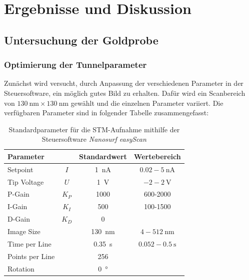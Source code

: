 \documentclass[a4paper,twoside,final]{article}
\begin{document}
\section{Ergebnisse und Diskussion}\label{sec:ErgebnisseUndDiskussion}
\subsection{Untersuchung der Goldprobe}
\subsubsection{Optimierung der Tunnelparameter}
Zunächst wird versucht, durch Anpassung der verschiedenen Parameter in der Steuersoftware, ein möglich gutes Bild zu erhalten. Dafür wird ein Scanbereich von $\SI{130}{\nano\metre} \times \SI{130}{\nano\metre}$ gewählt und die einzelnen Parameter variiert.
Die verfügbaren Parameter sind in folgender Tabelle zusammengefasst:
\begin{table}[ht]
	\centering
	\caption{Standardparameter für die STM-Aufnahme mithilfe der Steuersoftware \textit{Nanosurf easyScan}}
	\label{tab:Parameter}
  \begin{tabular}{l c c c}
   \toprule
   Parameter   &       & Standardwert          & Wertebereich\\
   \midrule
   Setpoint    & $I$   & \SI{1}{\nano\ampere}  & $0.02-\SI{5}{\nano\ampere}$\\
   Tip Voltage & $U$   & \SI{1}{\volt}         & $-2 - \SI{2}{\volt}$\\
   P-Gain      & $K_P$ & 1000                  & 600-2000\\
   I-Gain      & $K_I$ & 500                   & 100-1500\\
   D-Gain      & $K_D$ & 0                     & \\
   Image Size  &       & \SI{130}{\nano\metre} & $4-\SI{512}{\nano\metre}$\\
   Time per Line &     & \SI{0.35}{\second}    & $0.052 - \SI{0.5}{\second}$\\
   Points per Line &   & 256                   &\\
   Rotation    &       & \SI{0}{\degree}       &\\ \bottomrule
  \end{tabular}
\end{table}
\end{document}
